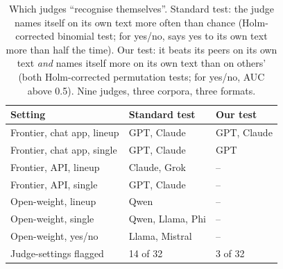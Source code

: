 \begin{table}[t]
\centering\small
\setlength\tabcolsep{3pt}
\begin{tabular}{lll}
\toprule
Setting & Standard test & Our test \\
\midrule
Frontier, chat app, lineup & GPT, Claude & GPT, Claude \\
Frontier, chat app, single & GPT, Claude & GPT \\
Frontier, API, lineup & Claude, Grok & -- \\
Frontier, API, single & GPT, Claude & -- \\
Open-weight, lineup & Qwen & -- \\
Open-weight, single & Qwen, Llama, Phi & -- \\
Open-weight, yes/no & Llama, Mistral & -- \\
\midrule
Judge-settings flagged & 14 of 32 & 3 of 32 \\
\bottomrule
\end{tabular}
\caption{Which judges ``recognise themselves''. Standard test: the judge names itself on its own text more often than chance (Holm-corrected binomial test; for yes/no, says yes to its own text more than half the time). Our test: it beats its peers on its own text \emph{and} names itself more on its own text than on others' (both Holm-corrected permutation tests; for yes/no, AUC above 0.5). Nine judges, three corpora, three formats.}
\label{tab:verdicts}
\end{table}
